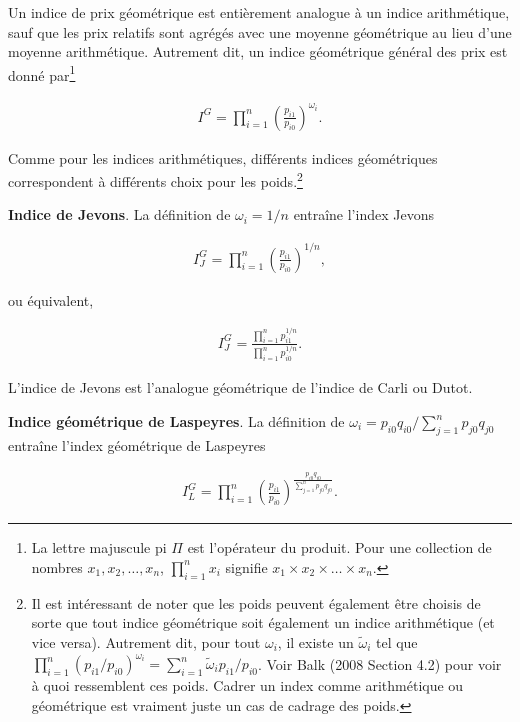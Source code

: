 \documentclass[]{article}
\begin{document}
Un indice de prix géométrique est entièrement analogue à un indice arithmétique, sauf que les prix relatifs sont agrégés avec une moyenne géométrique au lieu d'une moyenne arithmétique. Autrement dit, un indice géométrique général des prix est donné par\footnote{La lettre majuscule pi \(\Pi\) est l'opérateur du produit. Pour une collection de nombres \(x_{1}, x_{2}, \ldots, x_{n}\), \(\prod_{i = 1}^{n} x_{i}\) signifie \(x_{1} \times x_{2} \times \ldots \times x_{n}\).}

\begin{align*}
I^{G} = \prod_{i = 1}^{n} \left(\frac{p_{i1}}{p_{i0}} \right)^{\omega_{i}}.
\end{align*}

Comme pour les indices arithmétiques, différents indices géométriques correspondent à différents choix pour les poids.\footnote{Il est intéressant de noter que les poids peuvent également être choisis de sorte que tout indice géométrique soit également un indice arithmétique (et vice versa). Autrement dit, pour tout \(\omega_{i}\), il existe un \(\tilde{\omega}_{i}\) tel que \(\prod_{i = 1}^{n} (p_{i1} / p_{i0})^{\omega_{i}} = \sum_{i = 1}^{n} \tilde{\omega}_{i} p_{i1} / p_{i0}\). Voir Balk (2008 Section 4.2) pour voir à quoi ressemblent ces poids. Cadrer un index comme arithmétique ou géométrique est vraiment juste un cas de cadrage des poids.}

\textbf{Indice de Jevons}. La définition de \(\omega_{i} = 1 / n\) entraîne l'index Jevons

\begin{align*}
I^{G}_{J} = \prod_{i = 1}^{n} \left(\frac{p_{i1}}{p_{i0}} \right)^{1 / n},
\end{align*}

ou équivalent,

\begin{align*}
I^{G}_{J} = \frac{\prod_{i = 1}^{n} p_{i1}^{1 / n}}{\prod_{i = 1}^{n} p_{i0}^{1 / n}}.
\end{align*}

L'indice de Jevons est l'analogue géométrique de l'indice de Carli ou Dutot.

\textbf{Indice géométrique de Laspeyres}. La définition de \(\omega_{i} = p_{i0} q_{i0} / \sum_{j = 1}^{n} p_{j0} q_{j0}\) entraîne l'index géométrique de Laspeyres

\begin{align*}
I^{G}_{L} = \prod_{i = 1}^{n} \left(\frac{p_{i1}}{p_{i0}} \right)^{\frac{p_{i0} q_{i0}}{\sum_{j = 1}^{n} p_{j0} q_{j0}}}.
\end{align*}
\end{document}
